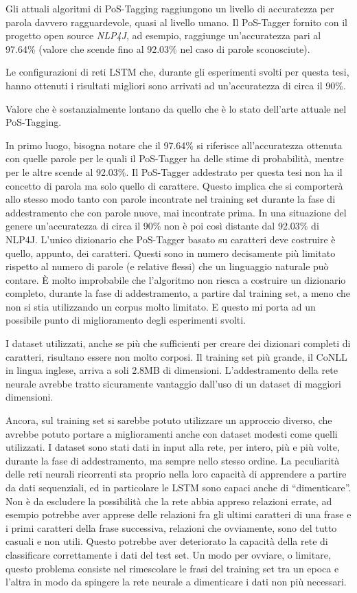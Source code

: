 Gli attuali algoritmi di PoS-Tagging raggiungono un livello di accuratezza per
parola davvero ragguardevole, quasi al livello umano. Il PoS-Tagger fornito con il
progetto open source \emph{NLP4J}, ad esempio, raggiunge un'accuratezza pari al
97.64\% (valore che scende fino al 92.03\% nel caso di parole sconosciute).

Le configurazioni di reti LSTM che, durante gli esperimenti svolti per questa
tesi, hanno ottenuti i risultati migliori sono arrivati ad un'accuratezza di circa
il 90\%.

Valore che \`e sostanzialmente lontano da quello che \`e lo stato dell'arte attuale
nel PoS-Tagging.

In primo luogo, bisogna notare che il 97.64\% si riferisce all'accuratezza
ottenuta con quelle parole per le quali il PoS-Tagger ha delle stime di
probabilit\`a, mentre per le altre scende al 92.03\%. Il PoS-Tagger addestrato
per questa tesi non ha il concetto di parola ma solo quello di carattere. Questo
implica che si comporter\`a allo stesso modo tanto con parole incontrate nel
training set durante la fase di addestramento che con parole nuove, mai incontrate
prima. In una situazione del genere un'accuratezza di circa il 90\% non \`e poi
cos\`i distante dal 92.03\% di NLP4J. L'unico dizionario che PoS-Tagger basato su
caratteri deve costruire \`e quello, appunto, dei caratteri. Questi sono in numero
decisamente pi\`u limitato rispetto al numero di parole (e relative flessi) che
un linguaggio naturale pu\`o contare. \`E molto improbabile che l'algoritmo non
riesca a costruire un dizionario completo, durante la fase di addestramento, a
partire dal training set, a meno che non si stia utilizzando un corpus molto
limitato. E questo mi porta ad un possibile punto di miglioramento degli
esperimenti svolti.

I dataset utilizzati, anche se pi\`u che sufficienti per creare dei dizionari
completi di caratteri, risultano essere non molto corposi. Il training set pi\`u
grande, il CoNLL in lingua inglese, arriva a soli 2.8MB di dimensioni. L'addestramento
della rete neurale avrebbe tratto sicuramente vantaggio dall'uso di un dataset di
maggiori dimensioni.

Ancora, sul training set si sarebbe potuto utilizzare un approccio diverso, che
avrebbe potuto portare a miglioramenti anche con dataset modesti come quelli utilizzati.
I dataset sono stati dati in input alla rete, per intero, pi\`u e pi\`u volte,
durante la fase di addestramento, ma sempre nello stesso ordine. La peculiarit\`a
delle reti neurali ricorrenti sta proprio nella loro capacit\`a di apprendere a
partire da dati sequenziali, ed in particolare le LSTM sono capaci anche di
``dimenticare''. Non \`e da escludere la possibilit\`a che la rete abbia appreso
relazioni errate, ad esempio potrebbe aver apprese delle relazioni fra gli ultimi
caratteri di una frase e i primi caratteri della frase successiva, relazioni che
ovviamente, sono del tutto casuali e non utili. Questo potrebbe aver deteriorato
la capacit\`a della rete di classificare correttamente i dati del test set. Un
modo per ovviare, o limitare, questo problema consiste nel rimescolare le frasi
del training set tra un epoca e l'altra in modo da spingere la rete neurale a
dimenticare i dati non pi\`u necessari.

